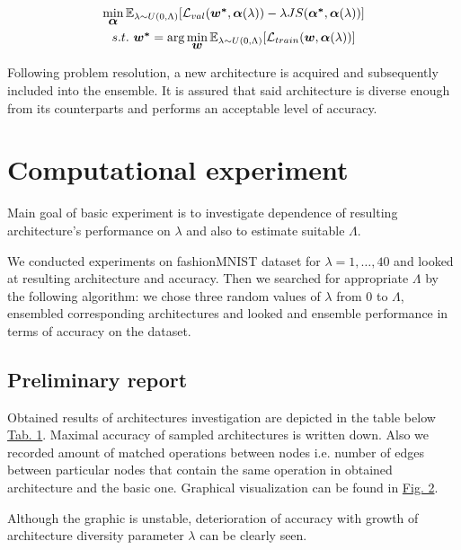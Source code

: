\documentclass{article}
\begin{document}
\begin{gather*}
    \min_{\mbox{\boldmath{$\alpha$}}} \mathbb{E}_{\lambda \sim U(0, \Lambda)} [\mathcal{L}_{val}(\mbox{\boldmath{$w^*$}}, \mbox{\boldmath{$\alpha$}}(\lambda)) - \lambda JS(\mbox{\boldmath{$\alpha^*$}}, \mbox{\boldmath{$\alpha$}}(\lambda))] \\
    s.t. \text{ } \mbox{\boldmath{$w^*$}} = \arg \min_{\mbox{\boldmath{$w$}}} \mathbb{E}_{\lambda \sim U(0, \Lambda)}[\mathcal{L}_{train}(\mbox{\boldmath{$w$}}, \mbox{\boldmath{$\alpha$}}(\lambda))]
\end{gather*}

Following problem resolution, a new architecture is acquired and subsequently included into the ensemble. It is assured that said architecture is diverse enough from its counterparts and performs an acceptable level of accuracy.

\section{Computational experiment}

Main goal of basic experiment is to investigate dependence of resulting architecture's performance on $\lambda$ and also to estimate suitable $\Lambda$.

We conducted experiments on fashionMNIST dataset for $\lambda = 1, \ldots, 40$ and looked at resulting architecture and accuracy. Then we searched for appropriate $\Lambda$ by the following algorithm: we chose three random values of $\lambda$ from 0 to $\Lambda$, ensembled corresponding architectures and looked and ensemble performance in terms of accuracy on the dataset.

\subsection{Preliminary report}

Obtained results of architectures investigation are depicted in the table below \hyperref[tab:prelim]{Tab. 1}. Maximal accuracy of sampled architectures is written down. Also we recorded amount of matched operations between nodes i.e. number of edges between particular nodes that contain the same operation in obtained architecture and the basic one. Graphical visualization can be found in \hyperref[fig:graph]{Fig. 2}.

Although the graphic is unstable, deterioration of accuracy with growth of architecture diversity parameter $\lambda$ can be clearly seen.
\end{document}
